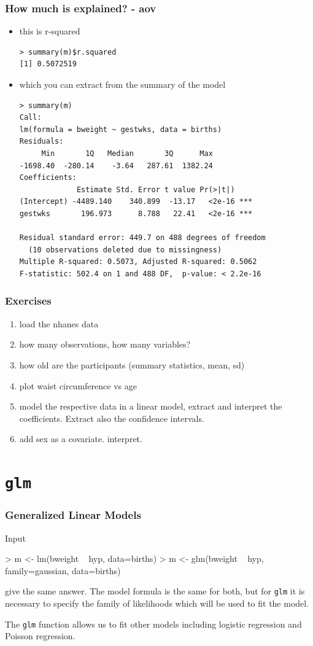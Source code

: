 \documentclass[xcolor={table}]{beamer}
\begin{document}
\begin{frame}[fragile]\frametitle{How much is explained? - aov}
\begin{itemize}
\item this is r-squared 
\begin{verbatim}
> summary(m)$r.squared
[1] 0.5072519
\end{verbatim}
\item which you can extract from the summary of the model\footnotesize
\begin{verbatim}
> summary(m)
Call:
lm(formula = bweight ~ gestwks, data = births)
Residuals:
     Min       1Q   Median       3Q      Max 
-1698.40  -280.14    -3.64   287.61  1382.24 
Coefficients:
             Estimate Std. Error t value Pr(>|t|)    
(Intercept) -4489.140    340.899  -13.17   <2e-16 ***
gestwks       196.973      8.788   22.41   <2e-16 ***

Residual standard error: 449.7 on 488 degrees of freedom
  (10 observations deleted due to missingness)
Multiple R-squared: 0.5073,	Adjusted R-squared: 0.5062 
F-statistic: 502.4 on 1 and 488 DF,  p-value: < 2.2e-16 
\end{verbatim}
\end{itemize}
\end{frame}

\begin{frame}\frametitle{Exercises}
  \begin{enumerate}
  \item load the nhanes data
  \item how many observations, how many variables?
  \item how old are the participants (summary statistics, mean, sd)
  \item plot waist circumference vs age
  \item model the respective data in a linear model, extract and interpret the coefficients. Extract also the confidence intervals.
  \item add sex as a covariate. interpret. 
  \end{enumerate}
  
\end{frame}


\section{\texttt{glm}}
\begin{frame}[fragile]\frametitle{Generalized Linear Models}
\begin{exampleblock}{Input}
\begin{semiverbatim}
> m <- lm(bweight ~ hyp, data=births)
> m <- glm(bweight ~ hyp, family=gaussian, data=births)
\end{semiverbatim}
\end{exampleblock}

give the same answer. The model formula is the same for both, but for \texttt{glm} it is necessary to specify the family of likelihoods which will be used to fit the model. 

The \texttt{glm} function allows us to fit other models including logistic regression and Poisson regression.
\end{frame}
\end{document}
